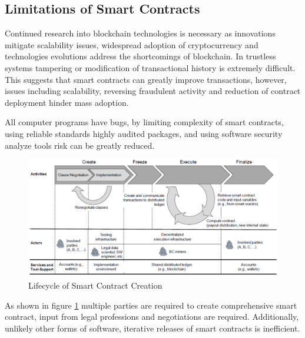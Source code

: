 \documentclass[12pt,tightenlines,letterpaper]{scrartcl}
\begin{document}
 
 
 
 
 

 \subsection{Limitations of Smart Contracts}
%
Continued research into \gls{blockchain} technologies is necessary as innovations mitigate scalability issues, widespread adoption of cryptocurrency and technologies evolutions address the shortcomings of blockchain. In trustless systems tampering or modification of transactional history is extremely difficult. This suggests that smart contracts can greatly improve transactions, however, issues including scalability, reversing fraudulent activity and reduction of contract deployment hinder mass adoption.

All computer programs have bugs, by limiting complexity of smart contracts,  using reliable standards highly audited packages, and using software security analyze tools risk can be greatly reduced. 
\begin{figure}[H]
\centering
\includegraphics[width=1\linewidth]{smartContractCreation}
\caption{Lifecycle of Smart Contract Creation \cite{Sillaber2017}}
\label{fig:smartcontractcreation}
\end{figure}

As shown in figure \ref{fig:smartcontractcreation} multiple parties are required to create comprehensive smart contract, input from legal professions and negotiations are required. Additionally, unlikely other forms of software, iterative releases of \glspl{smart contract} is inefficient.

\end{document}
